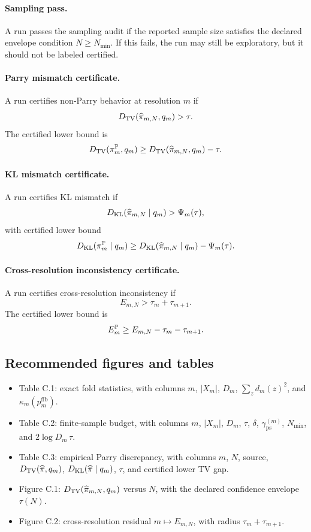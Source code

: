 \paragraph{Sampling pass.}
A run passes the sampling audit if the reported sample size satisfies the declared envelope condition \(N\ge N_{\min}\).  If this fails, the run may still be exploratory, but it should not be labeled certified.

\paragraph{Parry mismatch certificate.}
A run certifies non-Parry behavior at resolution \(m\) if
\[
D_{\mathrm{TV}}(\widehat\pi_{m,N},q_m)>\tau.
\]
The certified lower bound is
\[
D_{\mathrm{TV}}(\pi_m^{\mathbb{P}},q_m)
\ge
D_{\mathrm{TV}}(\widehat\pi_{m,N},q_m)-\tau.
\]

\paragraph{KL mismatch certificate.}
A run certifies KL mismatch if
\[
D_{\mathrm{KL}}(\widehat\pi_{m,N}\mid q_m)>\Psi_m(\tau),
\]
with certified lower bound
\[
D_{\mathrm{KL}}(\pi_m^{\mathbb{P}}\mid q_m)
\ge
D_{\mathrm{KL}}(\widehat\pi_{m,N}\mid q_m)-\Psi_m(\tau).
\]

\paragraph{Cross-resolution inconsistency certificate.}
A run certifies cross-resolution inconsistency if
\[
E_{m,N}>\tau_m+\tau_{m+1}.
\]
The certified lower bound is
\[
E_m^{\mathbb{P}}\ge E_{m,N}-\tau_m-\tau_{m+1}.
\]

\subsection{Recommended figures and tables}

\begin{itemize}
\item Table C.1: exact fold statistics, with columns \(m\), \(|X_m|\), \(D_m\), \(\sum_zd_m(z)^2\), and \(\kappa_m(p_m^{\mathrm{fib}})\).
\item Table C.2: finite-sample budget, with columns \(m\), \(|X_m|\), \(D_m\), \(\tau\), \(\delta\), \(\gamma_{\mathrm{ps}}^{(m)}\), \(N_{\min}\), and \(2\log D_m\,\tau\).
\item Table C.3: empirical Parry discrepancy, with columns \(m\), \(N\), source, \(D_{\mathrm{TV}}(\widehat\pi,q_m)\), \(D_{\mathrm{KL}}(\widehat\pi\mid q_m)\), \(\tau\), and certified lower TV gap.
\item Figure C.1: \(D_{\mathrm{TV}}(\widehat\pi_{m,N},q_m)\) versus \(N\), with the declared confidence envelope \(\tau(N)\).
\item Figure C.2: cross-resolution residual \(m\mapsto E_{m,N}\), with radius \(\tau_m+\tau_{m+1}\).
\end{itemize}

